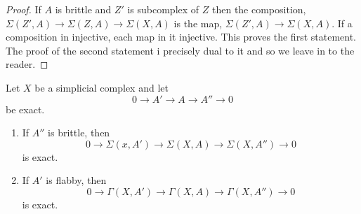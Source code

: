 \begin{proof}
If $A$ is brittle and $Z'$ is subcomplex of $Z$ then the composition, $\Sigma(Z', A)\rightarrow \Sigma(Z, A) \rightarrow \Sigma(X, A)$ is the map, $\Sigma(Z', A) \rightarrow \Sigma(X, A)$. If a composition in injective, each map in it injective. This proves the first statement. The proof of the second statement i precisely dual to it and so we leave in to the reader.
\end{proof}

\begin{theorem}\label{art6-thm-6.5}
Let $X$ be a simplicial complex and let
$$
0 \rightarrow A' \rightarrow A \rightarrow A'' \rightarrow 0
$$
be exact.
\begin{enumerate}[(1)]
    \item If $A''$ is brittle, then
    $$
    0 \rightarrow \Sigma(x, A') \rightarrow \Sigma(X, A)\rightarrow\Sigma(X, A'') \rightarrow 0
    $$
    is exact.\label{art6-thm6.5-enmu-1}
    
    \item If $A'$ is flabby, then
    $$
    0\rightarrow \Gamma(X, A') \rightarrow \Gamma (X,A)\rightarrow \Gamma(X, A'')\rightarrow 0
    $$
    is exact.\label{art6-thm6.5-enum-2}
\end{enumerate}
\end{theorem}

